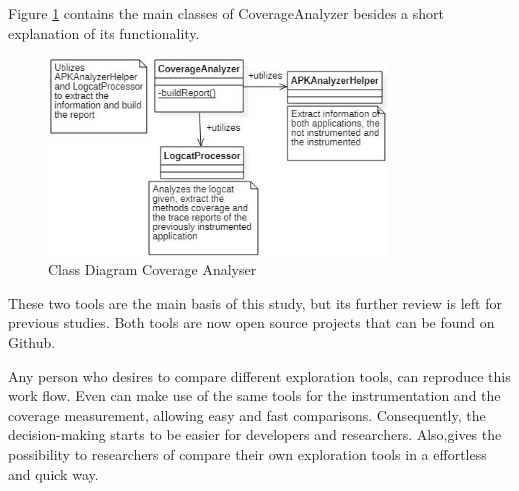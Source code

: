 Figure \ref{fig:ca} contains the main classes of CoverageAnalyzer besides a short explanation of its functionality.

\begin{figure}[h]
\centering
\includegraphics[width=0.8\textwidth]{../Figures/ClassDiagramCA.jpg}
\caption{Class Diagram Coverage Analyser}\label{fig:ca}
\end{figure}

These two tools are the main basis of this study, but its further review is left for previous studies. Both tools are now open source projects that can be found on Github.

Any person who desires to compare different exploration tools, can reproduce this work flow. Even can make use of the same tools for the instrumentation and the coverage measurement, allowing easy and fast comparisons. Consequently, the decision-making starts to be easier for developers and researchers. Also,gives the possibility to researchers of compare their own exploration tools in a effortless and quick way.